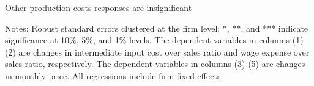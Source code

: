 \documentclass[10pt]{beamer}
\begin{document}
\begin{frame}{Other production costs responses are insignificant}
\begin{table}[htbp]
{\begin{threeparttable}
        \begin{tablenotes}
            \footnotesize
            \item Notes: Robust standard errors clustered at the firm level;  *, **, and *** indicate significance at 10\%, 5\%, and 1\% levels. The dependent variables in columns (1)-(2) are changes in intermediate input cost over sales ratio and wage expense over sales ratio, respectively. The dependent variables in columns (3)-(5) are changes in monthly price. All regressions include firm fixed effects.
    	\end{tablenotes}
        \end{threeparttable}
        }
    \end{table}
\hyperlink{borrowing_cost}{}
\end{frame}
\end{document}
